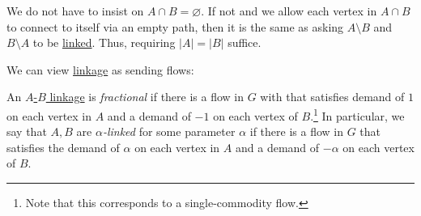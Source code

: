 \begin{note}
	We do not have to insist on \(A \cap B = \varnothing \). If not and we allow each vertex in \(A \cap B\) to connect to itself via an empty path, then it is the same as asking \(A\setminus B\) and \(B\setminus A\) to be \hyperref[def:linkage]{linked}. Thus, requiring \(\lvert A \rvert = \lvert B \rvert \) suffice.
\end{note}

We can view \hyperref[def:linkage]{linkage} as sending flows:

\begin{definition}\label{def:fractional-linkage}
	An \hyperref[def:linkage]{\(A\)-\(B\) linkage} is \emph{fractional} if there is a flow in \(G\) with that satisfies demand of \(1\) on each vertex in \(A\) and a demand of \(-1\) on each vertex of \(B\).\footnote{Note that this corresponds to a single-commodity flow.} In particular, we say that \(A, B\) are \emph{\(\alpha \)-linked} for some parameter \(\alpha \) if there is a flow in \(G\) that satisfies the demand of \(\alpha \) on each vertex in \(A\) and a demand of \(-\alpha \) on each vertex of \(B\).
\end{definition}

